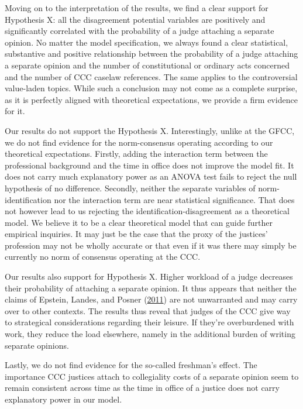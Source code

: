 \documentclass[
  11pt,
]{article}
\begin{document}
Moving on to the interpretation of the results, we find a clear support
for Hypothesis X: all the disagreement potential variables are
positively and significantly correlated with the probability of a judge
attaching a separate opinion. No matter the model specification, we
always found a clear statistical, substantive and positive relationship
between the probability of a judge attaching a separate opinion and the
number of constitutional or ordinary acts concerned and the number of
CCC caselaw references. The same applies to the controversial
value-laden topics. While such a conclusion may not come as a complete
surprise, as it is perfectly aligned with theoretical expectations, we
provide a firm evidence for it.

Our results do not support the Hypothesis X. Interestingly, unlike at
the GFCC, we do not find evidence for the norm-consensus operating
according to our theoretical expectations. Firstly, adding the
interaction term between the professional background and the time in
office does not improve the model fit. It does not carry much
explanatory power as an ANOVA test fails to reject the null hypothesis
of no difference. Secondly, neither the separate variables of
norm-identification nor the interaction term are near statistical
significance. That does not however lead to us rejecting the
identification-disagreement as a theoretical model. We believe it to be
a clear theoretical model that can guide further empirical inquiries. It
may just be the case that the proxy of the justices' profession may not
be wholly accurate or that even if it was there may simply be currently
no norm of consensus operating at the CCC.

Our results also support for Hypothesis X. Higher workload of a judge
decreases their probability of attaching a separate opinion. It thus
appears that neither the claims of Epstein, Landes, and Posner
(\protect\hyperlink{ref-epsteinWhyWhenJudges2011}{2011}) are not
unwarranted and may carry over to other contexts. The results thus
reveal that judges of the CCC give way to strategical considerations
regarding their leisure. If they're overburdened with work, they reduce
the load elsewhere, namely in the additional burden of writing separate
opinions.

Lastly, we do not find evidence for the so-called freshman's effect. The
importance CCC justices attach to collegiality costs of a separate
opinion seem to remain consistent across time as the time in office of a
justice does not carry explanatory power in our model.
\end{document}

